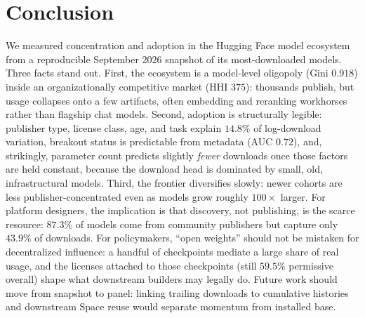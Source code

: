 \documentclass[conference]{IEEEtran}
\begin{document}
\section{Conclusion}
We measured concentration and adoption in the Hugging Face model ecosystem
from a reproducible September 2026 snapshot of its most-downloaded models.
Three facts stand out. First, the ecosystem is a model-level oligopoly
(Gini $0.918$) inside an organizationally competitive market (HHI $375$):
thousands publish, but usage collapses onto a few artifacts, often embedding
and reranking workhorses rather than flagship chat models. Second, adoption
is structurally legible: publisher type, license class, age, and task explain
$14.8\%$ of log-download variation, breakout status is predictable from
metadata (AUC $0.72$), and, strikingly, parameter count predicts slightly
\emph{fewer} downloads once those factors are held constant, because the
download head is dominated by small, old, infrastructural models. Third, the
frontier diversifies slowly: newer cohorts are less publisher-concentrated
even as models grow roughly $100\times$ larger. For platform designers, the
implication is that discovery, not publishing, is the scarce resource:
$87.3\%$ of models come from community publishers but capture only $43.9\%$
of downloads. For policymakers, ``open weights'' should not be mistaken for
decentralized influence: a handful of checkpoints mediate a large share of
real usage, and the licenses attached to those checkpoints (still $59.5\%$
permissive overall) shape what downstream builders may legally do. Future
work should move from snapshot to panel: linking trailing downloads to
cumulative histories and downstream Space reuse would separate momentum from
installed base.
\end{document}
